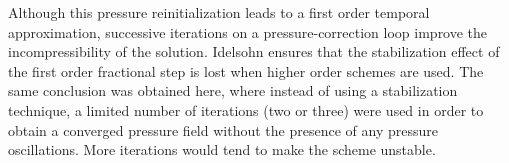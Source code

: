 Although this pressure reinitialization leads to a first order temporal approximation, successive iterations on a pressure-correction loop improve the incompressibility of the solution. Idelsohn\cite{Idelsohn13c} ensures that the stabilization effect of the first order fractional step is lost when higher order schemes are used. The same conclusion was obtained here, where instead of using a stabilization technique, a limited number of iterations (two or three) were used in order to obtain a converged pressure field without the presence of any pressure oscillations. More iterations would tend to make the scheme unstable. 